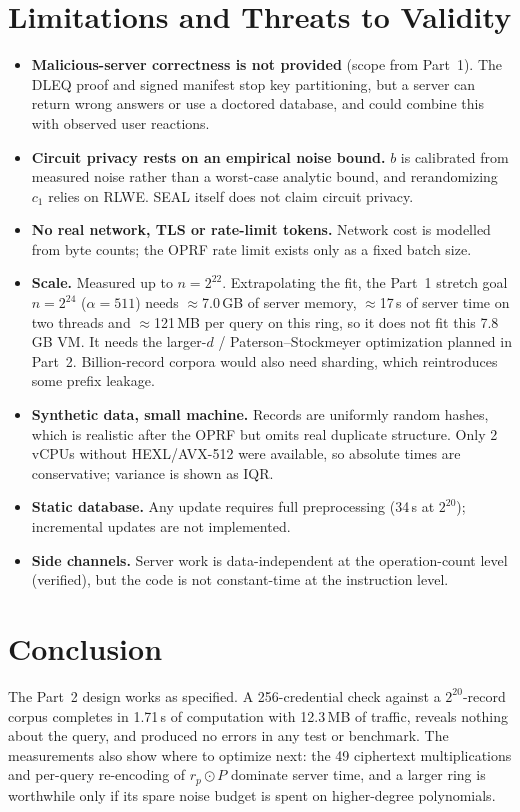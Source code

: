 \documentclass[11pt]{article}
\newcommand{\TotMTwo}{1.71}
\begin{document}
\section{Limitations and Threats to Validity}
\begin{itemize}[leftmargin=*]
  \item \textbf{Malicious-server correctness is not provided} (scope from Part~1). The DLEQ proof and signed manifest stop key partitioning, but a server can return wrong answers or use a doctored database, and could combine this with observed user reactions.
  \item \textbf{Circuit privacy rests on an empirical noise bound.} $b$ is calibrated from measured noise rather than a worst-case analytic bound, and rerandomizing $c_1$ relies on RLWE. SEAL itself does not claim circuit privacy.
  \item \textbf{No real network, TLS or rate-limit tokens.} Network cost is modelled from byte counts; the OPRF rate limit exists only as a fixed batch size.
  \item \textbf{Scale.} Measured up to $n=2^{22}$. Extrapolating the fit, the Part~1 stretch goal $n=2^{24}$ ($\alpha=511$) needs $\approx$7.0\,GB of server memory, $\approx$17\,s of server time on two threads and $\approx$121\,MB per query on this ring, so it does not fit this 7.8\,GB VM. It needs the larger-$d$ / Paterson--Stockmeyer optimization planned in Part~2. Billion-record corpora would also need sharding, which reintroduces some prefix leakage.
  \item \textbf{Synthetic data, small machine.} Records are uniformly random hashes, which is realistic after the OPRF but omits real duplicate structure. Only 2 vCPUs without HEXL/AVX-512 were available, so absolute times are conservative; variance is shown as IQR.
  \item \textbf{Static database.} Any update requires full preprocessing (34\,s at $2^{20}$); incremental updates are not implemented.
  \item \textbf{Side channels.} Server work is data-independent at the operation-count level (verified), but the code is not constant-time at the instruction level.
\end{itemize}

\section{Conclusion}
The Part~2 design works as specified. A 256-credential check against a $2^{20}$-record corpus completes in \TotMTwo\,s of computation with 12.3\,MB of traffic, reveals nothing about the query, and produced no errors in any test or benchmark. The measurements also show where to optimize next: the 49 ciphertext multiplications and per-query re-encoding of $r_p\odot P$ dominate server time, and a larger ring is worthwhile only if its spare noise budget is spent on higher-degree polynomials.
\end{document}
